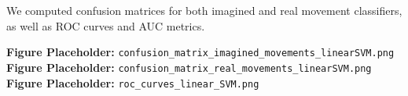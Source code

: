 \documentclass[
  letterpaper,
  DIV=11,
  numbers=noendperiod]{scrartcl}
\begin{document}
We computed confusion matrices for both imagined and real movement
classifiers, as well as ROC curves and AUC metrics.

\textbf{Figure Placeholder:}
\texttt{confusion\_matrix\_imagined\_movements\_linearSVM.png}
\textbf{Figure Placeholder:}
\texttt{confusion\_matrix\_real\_movements\_linearSVM.png}
\textbf{Figure Placeholder:} \texttt{roc\_curves\_linear\_SVM.png}

\begin{figure}

\end{figure}
\end{document}
